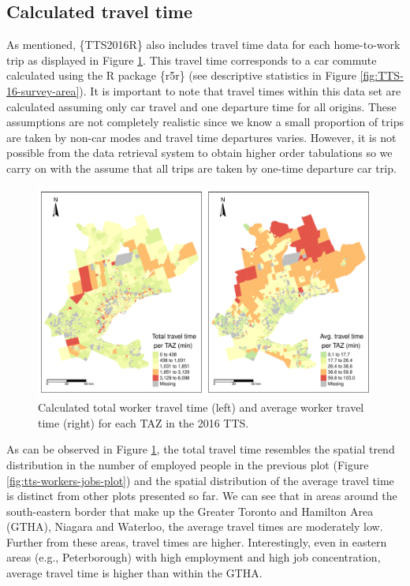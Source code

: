 \documentclass[Royal,times,sageh]{sagej}
\begin{document}
\hypertarget{calculated-travel-time}{%
\subsection{Calculated travel time}\label{calculated-travel-time}}

As mentioned, \{TTS2016R\} also includes travel time data for each
home-to-work trip as displayed in Figure \ref{fig:plot-tt-ttpertrip}.
This travel time corresponds to a car commute calculated using the R
package \{r5r\} (see descriptive statistics in Figure
\ref{fig:TTS-16-survey-area}). It is important to note that travel times
within this data set are calculated assuming only car travel and one
departure time for all origins. These assumptions are not completely
realistic since we know a small proportion of trips are taken by non-car
modes and travel time departures varies. However, it is not possible
from the data retrieval system to obtain higher order tabulations so we
carry on with the assume that all trips are taken by one-time departure
car trip.

\begin{figure}
\includegraphics[width=1\linewidth]{Manuscript-Data-Package_files/figure-latex/plot-tt-ttpertrip-1} \caption{\label{fig:plot-tt-ttpertrip}Calculated total worker travel time (left) and average worker travel time (right) for each TAZ in the 2016 TTS.}\label{fig:plot-tt-ttpertrip}
\end{figure}
\newpage

As can be observed in Figure \ref{fig:plot-tt-ttpertrip}, the total
travel time resembles the spatial trend distribution in the number of
employed people in the previous plot (Figure
\ref{fig:tts-workers-jobs-plot}) and the spatial distribution of the
average travel time is distinct from other plots presented so far. We
can see that in areas around the south-eastern border that make up the
Greater Toronto and Hamilton Area (GTHA), Niagara and Waterloo, the
average travel times are moderately low. Further from these areas,
travel times are higher. Interestingly, even in eastern areas (e.g.,
Peterborough) with high employment and high job concentration, average
travel time is higher than within the GTHA.
\end{document}
